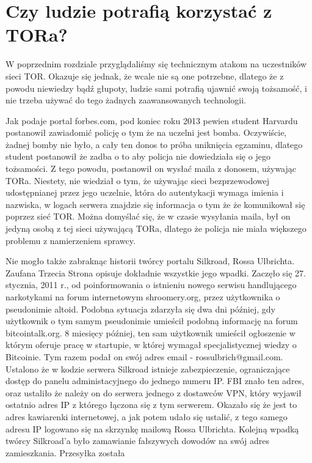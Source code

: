 \documentclass[polish]{kbk}
\begin{document}
\section{Czy ludzie potrafią korzystać z TORa?}
W poprzednim rozdziale przyglądaliśmy się technicznym atakom na uczestników sieci TOR. 
Okazuje się jednak, że wcale nie są one potrzebne, dlatego że z powodu niewiedzy bądź głupoty,
ludzie sami potrafią ujawnić swoją tożsamość, i nie trzeba używać do tego żadnych
zaawansowanych technologii.
\par 
Jak podaje portal forbes.com\cite{harvardstudent}, pod koniec
roku 2013 pewien student Harvardu postanowił zawiadomić policję o tym że na uczelni 
jest bomba. Oczywiście, żadnej bomby nie było, a cały ten donos to próba uniknięcia
egzaminu, dlatego student postanowił że zadba o to aby policja nie dowiedziała się 
o jego tożsamości. Z tego powodu, postanowił on wysłać maila z donosem, używając TORa.
Niestety, nie wiedział o tym, że używając sieci bezprzewodowej udostępnianej przez jego
uczelnie, która do autentykacji wymaga imienia i nazwiska, w logach serwera znajdzie 
się informacja o tym że że komunikował się poprzez sieć TOR. Można domyślać się, 
że w czasie wysyłania maila, był on jedyną osobą z tej sieci używającą TORa, 
dlatego że policja nie miała większego problemu z namierzeniem sprawcy. 
\par
Nie mogło także zabraknąc historii twórcy portalu Silkroad, Rossa Ulbrichta. Zaufana Trzecia
Strona\cite{z3sulbricht} opisuje dokładnie wszystkie jego wpadki. 
Zaczęło się 27. stycznia, 2011 r., od 
poinformowania o istnieniu nowego serwisu handlującego narkotykami na forum 
internetowym shroomery.org, przez użytkownika o pseudonimie altoid. Podobna sytuacja
zdarzyła się dwa dni później, gdy użytkownik o tym samym pseudonimie umieścił podobną
informację na forum bitcointalk.org. 8 miesięcy później, ten sam użytkownik umieścił 
ogłoszenie w którym oferuje pracę w startupie, w której wymagał specjalistycznej wiedzy
o Bitcoinie. Tym razem podał on swój adres email - rossulbrich@gmail.com.
Ustalono że w kodzie serwera Silkroad istnieje zabezpieczenie, ograniczające dostęp
do panelu administacyjnego do jednego numeru IP. FBI znało ten adres, oraz ustaliło
że należy on do serwera jednego z dostawców VPN, który wyjawił ostatnio adres IP 
z którego łączona się z tym serwerem. Okazało się że jest to adres kawiarenki 
internetowej, a jak potem udało się ustalić, z tego samego adresu IP logowano się
na skrzynkę mailową Rossa Ulbrichta. Kolejną wpadką twórcy Silkroad'a było
zamawianie fałszywych dowodów na swój adres zamieszkania. Przesyłka została 
\end{document}
